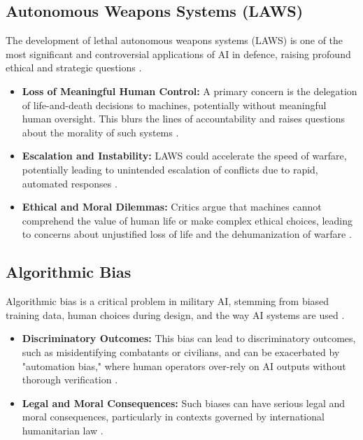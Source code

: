 \subsection{Autonomous Weapons Systems (LAWS)}
The development of lethal autonomous weapons systems (LAWS) is one of the most significant and controversial applications of AI in defence, raising profound ethical and strategic questions \cite{CIGIOnline_LAWS}.
\begin{itemize}
    \item \textbf{Loss of Meaningful Human Control:} A primary concern is the delegation of life-and-death decisions to machines, potentially without meaningful human oversight. This blurs the lines of accountability and raises questions about the morality of such systems \cite{AMSConsulting_LAWS, StopKillerRobots_LAWS}.
    \item \textbf{Escalation and Instability:} LAWS could accelerate the speed of warfare, potentially leading to unintended escalation of conflicts due to rapid, automated responses \cite{Concordia_LAWS}.
\item \textbf{Ethical and Moral Dilemmas:} Critics argue that machines cannot comprehend the value of human life or make complex ethical choices, leading to concerns about unjustified loss of life and the dehumanization of warfare \cite{DefenceGovAU_LAWS, QMUL_LAWS}.
\end{itemize}

\subsection{Algorithmic Bias}
Algorithmic bias is a critical problem in military AI, stemming from biased training data, human choices during design, and the way AI systems are used \cite{BiometricUpdate_AlgorithmicBias}.
\begin{itemize}
    \item \textbf{Discriminatory Outcomes:} This bias can lead to discriminatory outcomes, such as misidentifying combatants or civilians, and can be exacerbated by "automation bias," where human operators over-rely on AI outputs without thorough verification \cite{ICRC_AlgorithmicBias_1, ICRC_AlgorithmicBias_2}.
    \item \textbf{Legal and Moral Consequences:} Such biases can have serious legal and moral consequences, particularly in contexts governed by international humanitarian law \cite{ICRC_AlgorithmicBias_3}.
\end{itemize}

